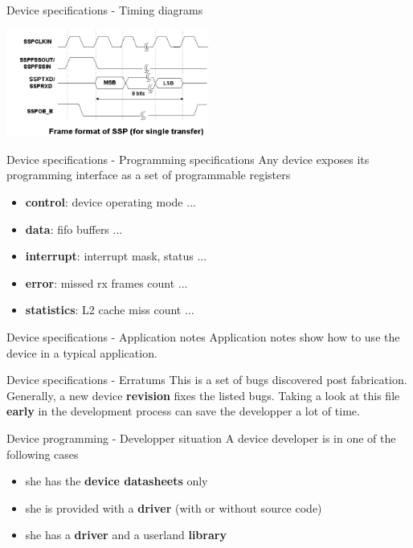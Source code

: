 \begin{frame}{Device specifications - Timing diagrams}
  \begin{center}
    \includegraphics[width=0.5\textwidth]{figures/misc_timing.jpg}
  \end{center}
\end{frame}

\begin{frame}{Device specifications - Programming specifications}
  Any device exposes its programming interface as a set of programmable registers
  \begin{itemize}
  \item \textbf{control}: device operating mode ...
  \item \textbf{data}: fifo buffers ...
  \item \textbf{interrupt}: interrupt mask, status ...
  \item \textbf{error}: missed rx frames count ...
  \item \textbf{statistics}: L2 cache miss count ...
  \end{itemize}
\end{frame}

\begin{frame}{Device specifications - Application notes}
  Application notes show how to use the device in a typical application.
\end{frame}

\begin{frame}{Device specifications - Erratums}
  This is a set of bugs discovered post fabrication. Generally, a new device \textbf{revision}
  fixes the listed bugs. Taking a look at this file \textbf{early} in the development process
  can save the developper a lot of time.
\end{frame}

\begin{frame}{Device programming - Developper situation}
  A device developer is in one of the following cases
  \begin{itemize}
  \item she has the \textbf{device datasheets} only
  \item she is provided with a \textbf{driver} (with or without source code)
  \item she has a \textbf{driver} and a userland \textbf{library}
  \end{itemize}
\end{frame}

